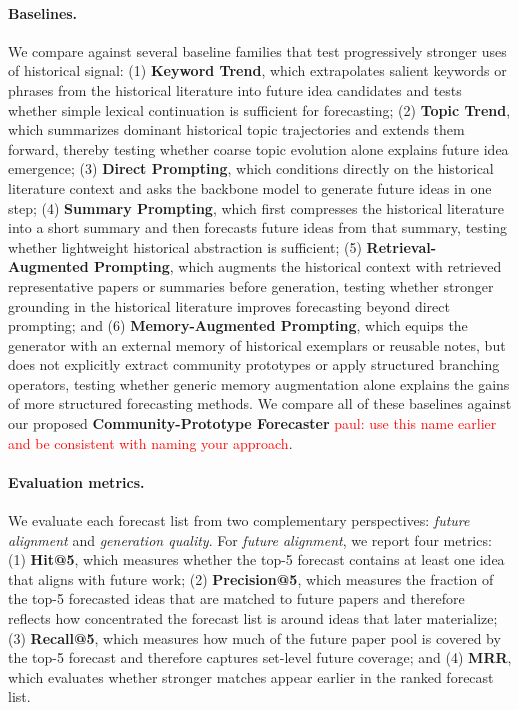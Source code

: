 \documentclass{article} %
\newcommand{\paul}[1]{\textcolor{red}{paul: #1}}
\begin{document}
\paragraph{Baselines.}
We compare against several baseline families that test progressively stronger uses of historical signal: (1) \textbf{Keyword Trend}, which extrapolates salient keywords or phrases from the historical literature into future idea candidates and tests whether simple lexical continuation is sufficient for forecasting; (2) \textbf{Topic Trend}, which summarizes dominant historical topic trajectories and extends them forward, thereby testing whether coarse topic evolution alone explains future idea emergence; (3) \textbf{Direct Prompting}, which conditions directly on the historical literature context and asks the backbone model to generate future ideas in one step; (4) \textbf{Summary Prompting}, which first compresses the historical literature into a short summary and then forecasts future ideas from that summary, testing whether lightweight historical abstraction is sufficient; (5) \textbf{Retrieval-Augmented Prompting}, which augments the historical context with retrieved representative papers or summaries before generation, testing whether stronger grounding in the historical literature improves forecasting beyond direct prompting; and (6) \textbf{Memory-Augmented Prompting}, which equips the generator with an external memory of historical exemplars or reusable notes, but does not explicitly extract community prototypes or apply structured branching operators, testing whether generic memory augmentation alone explains the gains of more structured forecasting methods. We compare all of these baselines against our proposed \textbf{Community-Prototype Forecaster} \paul{use this name earlier and be consistent with naming your approach}.

\paragraph{Evaluation metrics.}
We evaluate each forecast list from two complementary perspectives: \emph{future alignment} and \emph{generation quality}. For \emph{future alignment}, we report four metrics: (1) \textbf{Hit@5}, which measures whether the top-5 forecast contains at least one idea that aligns with future work; (2) \textbf{Precision@5}, which measures the fraction of the top-5 forecasted ideas that are matched to future papers and therefore reflects how concentrated the forecast list is around ideas that later materialize; (3) \textbf{Recall@5}, which measures how much of the future paper pool is covered by the top-5 forecast and therefore captures set-level future coverage; and (4) \textbf{MRR}, which evaluates whether stronger matches appear earlier in the ranked forecast list.
\end{document}
